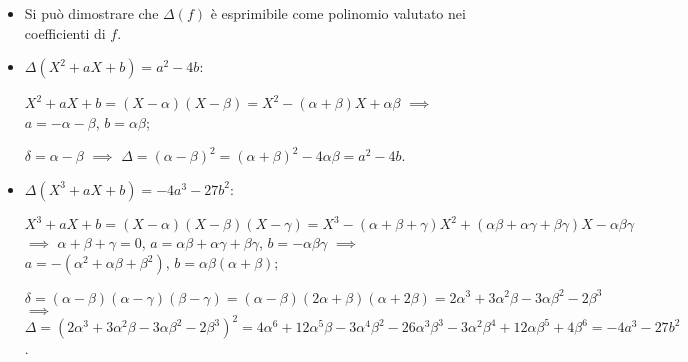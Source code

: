 \begin{itemize}
\item Si pu\`o dimostrare che $\Delta(f)$ è esprimibile come polinomio valutato nei coefficienti di $f$.
\item $\Delta(X^2+aX+b)=a^2-4b$:
\smallskip

$X^2+aX+b=(X-\alpha)(X-\beta)=X^2-(\alpha+\beta)X+\alpha\beta$ $\implies$ $a=-\alpha-\beta$, $b=\alpha\beta$;

$\delta=\alpha-\beta$ $\implies$ $\Delta=(\alpha-\beta)^2=(\alpha+\beta)^2-4\alpha\beta=a^2-4b$.
\item $\Delta(X^3+aX+b)=-4a^3-27b^2$:
\smallskip

$X^3+aX+b=(X-\alpha)(X-\beta)(X-\gamma)=X^3-(\alpha+\beta+\gamma)X^2+(\alpha\beta+\alpha\gamma+\beta\gamma)X-\alpha\beta\gamma$ $\implies$ $\alpha+\beta+\gamma=0$, $a=\alpha\beta+\alpha\gamma+\beta\gamma$, $b=-\alpha\beta\gamma$ $\implies$ $a=-(\alpha^2+\alpha\beta+\beta^2)$, $b=\alpha\beta(\alpha+\beta)$;

$\delta=(\alpha-\beta)(\alpha-\gamma)(\beta-\gamma)=(\alpha-\beta)(2\alpha+\beta)(\alpha+2\beta)=2\alpha^3+3\alpha^2\beta-3\alpha\beta^2-2\beta^3$ $\implies$ $\Delta=(2\alpha^3+3\alpha^2\beta-3\alpha\beta^2-2\beta^3)^2=4\alpha^6+12\alpha^5\beta-3\alpha^4\beta^2-26\alpha^3\beta^3-3\alpha^2\beta^4+12\alpha\beta^5+4\beta^6=-4a^3-27b^2$.
\end{itemize}




